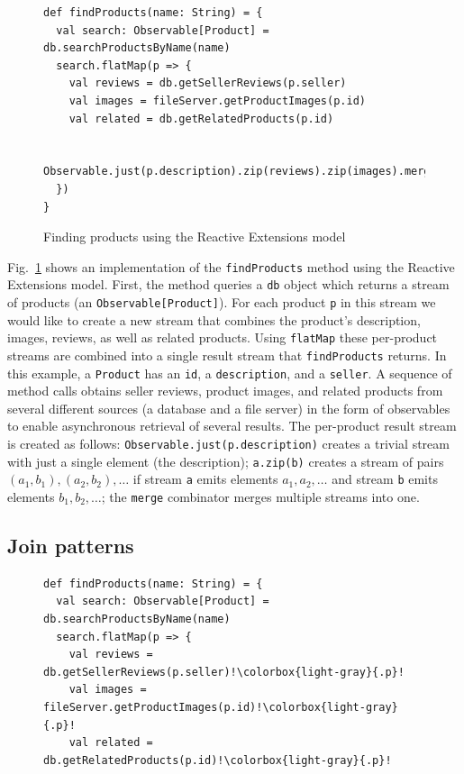 \documentclass[runningheads]{llncs}
\begin{document}
\begin{sloppypar}
\begin{figure}[ht]
\centering
\lstset{numbers=left}
\begin{lstlisting}
def findProducts(name: String) = {
  val search: Observable[Product] = db.searchProductsByName(name)
  search.flatMap(p => {
    val reviews = db.getSellerReviews(p.seller)
    val images = fileServer.getProductImages(p.id)
    val related = db.getRelatedProducts(p.id)

    Observable.just(p.description).zip(reviews).zip(images).merge(related)
  })
}
\end{lstlisting}
\caption{Finding products using the Reactive Extensions model}
\label{fig:find-products}
\end{figure}

Fig.~\ref{fig:find-products} shows an implementation of the
\verb|findProducts| method using the Reactive Extensions model. First, the
method queries a \verb|db| object which returns a stream of products (an
\verb|Observable[Product]|). For each product \verb|p| in this stream we would
like to create a new stream that combines the product's description, images,
reviews, as well as related products. Using \verb|flatMap| these per-product
streams are combined into a single result stream that \verb|findProducts|
returns. In this example, a \verb|Product| has an \verb|id|, a
\verb|description|, and a \verb|seller|. A sequence of method calls obtains
seller reviews, product images, and related products from several different
sources (a database and a file server) in the form of observables to enable
asynchronous retrieval of several results. The per-product result stream is
created as follows: \verb|Observable.just(p.description)| creates a trivial
stream with just a single element (the description); \verb|a.zip(b)| creates a
stream of pairs $(a_1, b_1), (a_2, b_2), \ldots$ if stream \verb|a| emits
elements $a_1, a_2, \ldots$ and stream \verb|b| emits elements $b_1, b_2,
\ldots$; the \verb|merge| combinator merges multiple streams into one.

\subsection{Join patterns}


\begin{figure}[ht]
\centering
\lstset{numbers=left}
\begin{lstlisting}[escapechar=!]
def findProducts(name: String) = {
  val search: Observable[Product] = db.searchProductsByName(name)
  search.flatMap(p => {
    val reviews = db.getSellerReviews(p.seller)!\colorbox{light-gray}{.p}!
    val images = fileServer.getProductImages(p.id)!\colorbox{light-gray}{.p}!
    val related = db.getRelatedProducts(p.id)!\colorbox{light-gray}{.p}!


\end{lstlisting}
\end{figure}
\end{sloppypar}
\end{document}
